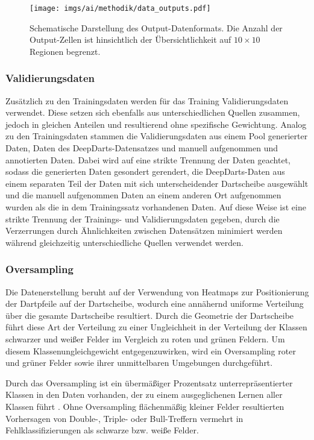 \begin{figure}
    \centering
    \texttt{[image: imgs/ai/methodik/data\_outputs.pdf]}
    \caption{Schematische Darstellung des Output-Datenformats. Die Anzahl der Output-Zellen ist hinsichtlich der Übersichtlichkeit auf $10 \times 10$ Regionen begrenzt.}
    \label{img:datenformat}
\end{figure}

\subsubsection{Validierungsdaten}
\label{sec:validierungsdaten}

Zusätzlich zu den Trainingsdaten werden für das Training Validierungsdaten verwendet. Diese setzen sich ebenfalls aus unterschiedlichen Quellen zusammen, jedoch in gleichen Anteilen und resultierend ohne spezifische Gewichtung. Analog zu den Trainingsdaten stammen die Validierungsdaten aus einem Pool generierter Daten, Daten des DeepDarts-Datensatzes und manuell aufgenommen und annotierten Daten. Dabei wird auf eine strikte Trennung der Daten geachtet, sodass die generierten Daten gesondert gerendert, die DeepDarts-Daten aus einem separaten Teil der Daten mit sich unterscheidender Dartscheibe ausgewählt und die manuell aufgenommen Daten an einem anderen Ort aufgenommen wurden als die in dem Trainingssatz vorhandenen Daten. Auf diese Weise ist eine strikte Trennung der Trainings- und Validierungsdaten gegeben, durch die Verzerrungen durch Ähnlichkeiten zwischen Datensätzen minimiert werden während gleichzeitig unterschiedliche Quellen verwendet werden.

\subsubsection{Oversampling}
\label{sec:oversampling}

Die Datenerstellung beruht auf der Verwendung von Heatmaps zur Positionierung der Dartpfeile auf der Dartscheibe, wodurch eine annähernd uniforme Verteilung über die gesamte Dartscheibe resultiert. Durch die Geometrie der Dartscheibe führt diese Art der Verteilung zu einer Ungleichheit in der Verteilung der Klassen schwarzer und weißer Felder im Vergleich zu roten und grünen Feldern. Um diesem Klassenungleichgewicht entgegenzuwirken, wird ein Oversampling roter und grüner Felder sowie ihrer unmittelbaren Umgebungen durchgeführt.

Durch das Oversampling ist ein übermäßiger Prozentsatz unterrepräsentierter Klassen in den Daten vorhanden, der zu einem ausgeglichenen Lernen aller Klassen führt \cite{oversampling}. Ohne Oversampling flächenmäßig kleiner Felder resultierten Vorhersagen von Double-, Triple- oder Bull-Treffern vermehrt in Fehlklassifizierungen als schwarze bzw. weiße Felder.

